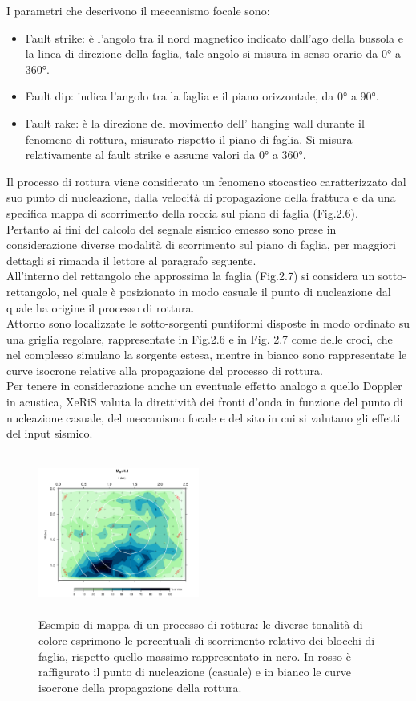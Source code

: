 \documentclass[a4paper,12pt,titlepage]{article}
\begin{document}
I parametri che descrivono il meccanismo focale sono:
\begin{itemize}
\item  Fault strike: è l'angolo tra il nord magnetico indicato dall'ago della bussola e la linea di direzione della faglia, tale angolo si misura in senso
orario da \ang{0} a \ang{360}.
\item  Fault dip: indica l'angolo tra la faglia e il piano orizzontale, da \ang{0} a \ang{90}.
\item Fault rake: è la direzione del movimento dell' hanging wall durante il fenomeno di rottura, misurato rispetto il piano di faglia. Si misura relativamente al fault strike e assume valori da \ang{0} a \ang{360}.
\end{itemize}
%
Il processo di rottura viene considerato un fenomeno stocastico caratterizzato dal suo punto di nucleazione, dalla velocità di propagazione della frattura e da una specifica mappa di scorrimento della roccia sul piano di faglia (Fig.2.6).\\
Pertanto ai fini del calcolo del segnale sismico emesso sono prese in considerazione diverse modalità di scorrimento sul piano di faglia, per maggiori dettagli si rimanda il lettore al paragrafo seguente.\\
All'interno del rettangolo che approssima la faglia (Fig.2.7) si considera un sotto-rettangolo, nel quale è posizionato in modo casuale il punto di nucleazione dal quale ha origine il processo di rottura.\\
Attorno sono localizzate le sotto-sorgenti puntiformi disposte in modo ordinato su una griglia regolare, rappresentate in Fig.2.6 e in Fig. 2.7 come delle croci, che nel complesso simulano la sorgente estesa, mentre in bianco sono rappresentate le curve isocrone relative alla propagazione del processo di rottura.\\
Per tenere in considerazione anche un eventuale effetto analogo a quello Doppler in acustica, XeRiS valuta la direttività dei fronti d'onda in funzione del punto di nucleazione casuale, del meccanismo focale e del sito in cui si valutano gli effetti del input sismico.\\

\begin{figure}[htbp]
 \centering
 \includegraphics[width = 150pt, height = 150pt]{Img/SlipMap.png}
 \caption{Esempio di mappa di un processo di rottura: le diverse tonalità di colore esprimono le percentuali di scorrimento relativo dei blocchi di faglia, rispetto quello massimo rappresentato in nero. In rosso è raffigurato il punto di nucleazione (casuale) e in bianco le curve isocrone della propagazione della rottura.}
 \label{fig:SlipMap}
\end{figure}
\end{document}
